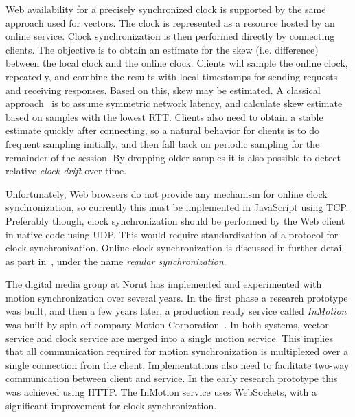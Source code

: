 
Web availability for a precisely synchronized clock is supported by the same
approach used for vectors. The clock is represented as a resource hosted by an
online service. Clock synchronization is then performed directly by connecting
clients. The objective is to obtain an estimate for the skew (i.e. difference)
between the local clock and the online clock. Clients will sample the online
clock, repeatedly, and combine the results with local timestamps for sending
requests and receiving responses. Based on this, skew may be estimated. A
classical approach~\cite{clocksync} is to assume symmetric network latency,
and calculate skew estimate based on samples with the lowest RTT. Clients also
need to obtain a stable estimate quickly after connecting, so a natural
behavior for clients is to do frequent sampling initially, and then fall back
on periodic sampling for the remainder of the session. By dropping older
samples it is also possible to detect relative \emph{clock drift} over time.

Unfortunately, Web browsers do not provide any mechanism for online clock
synchronization, so currently this must be implemented in JavaScript using
TCP. Preferably though, clock synchronization should be performed by the Web
client in native code using UDP. This would require standardization of a
protocol for clock synchronization. Online clock synchronization is discussed
in further detail as part in~\cite{msv}, under the name \emph{regular
synchronization}.


The digital media group at Norut has implemented and experimented with motion
synchronization over several years. In the first phase a research prototype
was built, and then a few years later, a production ready service called
\emph{InMotion} was built by spin off company Motion Corporation~\cite{mcorp}.
In both systems, vector service and clock service are merged into a single
motion service. This implies that all communication required for motion
synchronization is multiplexed over a single connection from the client.
Implementations also need to facilitate two-way communication between client
and service. In the early research prototype this was achieved using HTTP. The
InMotion service uses WebSockets, with a significant improvement for clock
synchronization.


